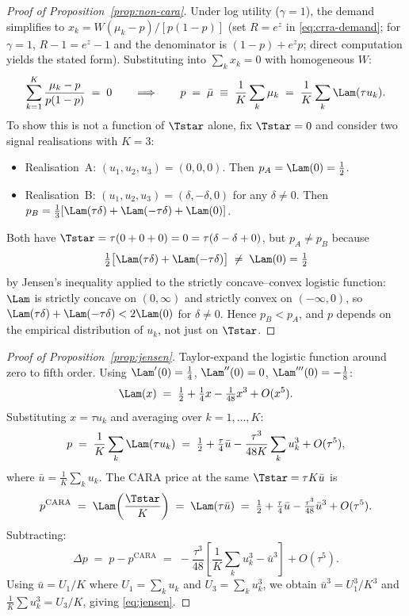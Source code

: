 \begin{proof}[Proof of Proposition~\ref{prop:non-cara}]
Under log utility ($\gamma=1$), the demand simplifies to
$x_{k}=W(\mu_{k}-p)/[p(1-p)]$ (set $R=e^{z}$ in \eqref{eq:crra-demand};
for $\gamma=1$, $R-1=e^{z}-1$ and the denominator is
$(1-p)+e^{z}p$; direct computation yields the stated form).
Substituting into $\sum_{k}x_{k}=0$ with homogeneous $W$:
\[
   \sum_{k=1}^{K}\frac{\mu_{k}-p}{p(1-p)} \;=\; 0
   \qquad\Longrightarrow\qquad
   p \;=\; \bar\mu \;\equiv\; \frac{1}{K}\sum_{k}\mu_{k}
   \;=\; \frac{1}{K}\sum_{k}\Lam(\tau u_{k}).
\]
To show this is not a function of $\Tstar$ alone, fix $\Tstar=0$ and
consider two signal realisations with $K=3$:
\begin{itemize}[topsep=2pt,itemsep=2pt]
\item Realisation~A: $(u_{1},u_{2},u_{3})=(0,0,0)$. Then
$p_{A}=\Lam(0)=\tfrac12$.
\item Realisation~B: $(u_{1},u_{2},u_{3})=(\delta,-\delta,0)$ for any
$\delta\neq 0$. Then
$p_{B}=\tfrac13[\Lam(\tau\delta)+\Lam(-\tau\delta)+\Lam(0)]$.
\end{itemize}
Both have $\Tstar=\tau(0+0+0)=0=\tau(\delta-\delta+0)$, but $p_{A}\neq
p_{B}$ because
\[
   \tfrac12\bigl[\Lam(\tau\delta)+\Lam(-\tau\delta)\bigr]
   \;\neq\; \Lam(0) = \tfrac12
\]
by Jensen's inequality applied to the strictly concave--convex logistic
function: $\Lam$ is strictly concave on $(0,\infty)$ and strictly convex
on $(-\infty,0)$, so $\Lam(\tau\delta)+\Lam(-\tau\delta)<2\Lam(0)$ for
$\delta\neq 0$. Hence $p_{B}<p_{A}$, and $p$ depends on the empirical
distribution of $u_{k}$, not just on $\Tstar$.
\end{proof}

\begin{proof}[Proof of Proposition~\ref{prop:jensen}]
Taylor-expand the logistic function around zero to fifth order. Using
$\Lam'(0)=\tfrac14$, $\Lam''(0)=0$, $\Lam'''(0)=-\tfrac18$:
\[
   \Lam(x) \;=\; \tfrac12+\tfrac14 x - \tfrac{1}{48}x^{3}+O(x^{5}).
\]
Substituting $x=\tau u_{k}$ and averaging over $k=1,\ldots,K$:
\[
   p \;=\; \frac{1}{K}\sum_{k}\Lam(\tau u_{k})
   \;=\; \tfrac12+\tfrac{\tau}{4}\bar u
         -\frac{\tau^{3}}{48K}\sum_{k}u_{k}^{3}+O(\tau^{5}),
\]
where $\bar u=\tfrac{1}{K}\sum_{k}u_{k}$.
The CARA price at the same $\Tstar=\tau K\bar u$ is
\[
   p^{\mathrm{CARA}}
   \;=\; \Lam\!\left(\frac{\Tstar}{K}\right)
   \;=\; \Lam(\tau\bar u)
   \;=\; \tfrac12+\tfrac{\tau}{4}\bar u - \tfrac{\tau^{3}}{48}\bar u^{3}
         +O(\tau^{5}).
\]
Subtracting:
\[
   \Delta p \;=\; p - p^{\mathrm{CARA}}
   \;=\; -\frac{\tau^{3}}{48}\left[
         \frac{1}{K}\sum_{k}u_{k}^{3} - \bar u^{3}\right]
   +O(\tau^{5}).
\]
Using $\bar u=U_{1}/K$ where $U_{1}=\sum_{k}u_{k}$ and
$U_{3}=\sum_{k}u_{k}^{3}$, we obtain $\bar u^{3}=U_{1}^{3}/K^{3}$ and
$\tfrac{1}{K}\sum u_{k}^{3}=U_{3}/K$, giving
\eqref{eq:jensen}.
\end{proof}

